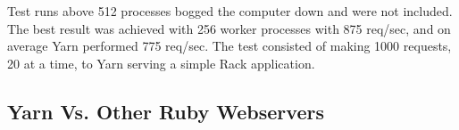 Test runs above 512 processes bogged the computer down and were not included.
The best result was achieved with 256 worker processes with 875
req/sec, and on average Yarn performed 775 req/sec. The test consisted of
making 1000 requests, 20 at a time, to Yarn serving a simple Rack application.

\subsection{Yarn Vs. Other Ruby Webservers}

